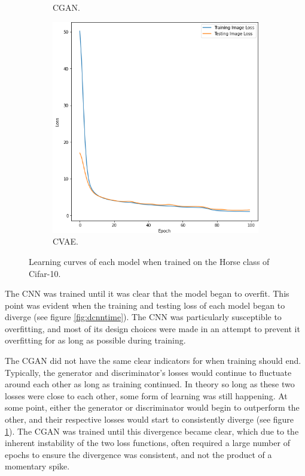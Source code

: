 \documentclass{l4proj}
\begin{document}
\begin{figure}[H]
\begin{subfigure}[b]{0.3\textwidth}
        \caption{CGAN.}
        \label{fig:cgantime}
    \end{subfigure}
    \begin{subfigure}[b]{0.3\textwidth}
        \includegraphics[width=\textwidth]{images/CVAETime.png}
        \caption{CVAE.}
        \label{fig:cvaetime}
    \end{subfigure}
    \caption{Learning curves of each model when trained on the Horse class of Cifar-10.}
    \label{fig:timeeval}
\end{figure}

The CNN was trained until it was clear that the model began to overfit. This point was evident when the training and testing loss of each model began to diverge (see figure \ref{fig:dcnntime}). The CNN was particularly susceptible to overfitting, and most of its design choices were made in an attempt to prevent it overfitting for as long as possible during training. 

The CGAN did not have the same clear indicators for when training should end. Typically, the generator and discriminator's losses would continue to fluctuate around each other as long as training continued. In theory so long as these two losses were close to each other, some form of learning was still happening. At some point, either the generator or discriminator would begin to outperform the other, and their respective losses would start to consistently diverge (see figure \ref{fig:cgantime}). The CGAN was trained until this divergence became clear, which due to the inherent instability of the two loss functions, often required a large number of epochs to ensure the divergence was consistent, and not the product of a momentary spike.
\end{document}

